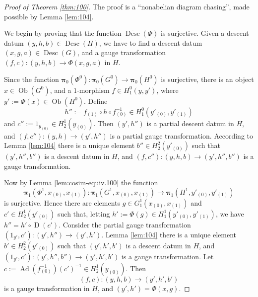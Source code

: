 \documentclass[a4paper,10pt]{amsart}
\theoremstyle{definition}
\numberwithin{equation}{section}
\newcommand{\opn}{\operatorname}
\newcommand{\ol}{\overline}
\newcommand{\tup}[1]{\textup{#1}}
\newcommand{\bsym}[1]{\boldsymbol{#1}}
\begin{document}
\begin{proof}[Proof of Theorem \tup{\ref{thm:100}}]
The proof is a ``nonabelian diagram chasing'', made possible by
Lemma \ref{lem:104}.

We begin by proving that the function $\ol{\opn{Desc}}(\Phi)$ is
surjective. Given a descent datum $(y, h, b) \in \opn{Desc}(H)$, we
have to find a descent datum $(x, g, a) \in \opn{Desc}(G)$, and a gauge
transformation $(f, c) :  (y, h, b) \to \Phi(x, g, a)$ in $H$. 

Since the function 
$\bsym{\bsym{\pi}}_0(\Phi^0) : \bsym{\bsym{\pi}}_0(G^0) \to
\bsym{\bsym{\pi}}_0(H^0)$
is surjective, there is an object $x \in \opn{Ob}(G^0)$, and a
$1$-morphism $f \in H^0_1(y, y')$, where 
$y' := \Phi(x) \in \opn{Ob}(H^0)$. 
Define 
\[ h'' := f_{(1)} \circ h \circ f_{(0)}^{-1} \in 
H^0_1(y'_{(0)}, y'_{(1)})  \]
and 
$c'' := 1_{y_{(0)}} \in H^1_2(y_{(0)})$. 
Then $(y', h'')$ is a partial descent datum in $H$, and 
$(f, c''): (y, h) \to (y', h'')$ is a partial gauge transformation.
According to Lemma \ref{lem:104} there is a unique element 
$b'' \in H^2_2(y'_{(0)})$ such that 
$(y', h'', b'')$ is a descent datum in $H$, and 
$(f, c''): (y, h, b) \to (y', h'', b'')$ is a gauge transformation.

Now by Lemma \ref{lem:cosim-equiv.100} the function 
\[ \bsym{\bsym{\pi}}_1(\Phi^1, x_{(0)}, x_{(1)}) : 
\bsym{\bsym{\pi}}_1(G^1, x_{(0)}, x_{(1)}) \to
\bsym{\bsym{\pi}}_1 ( H^1, y'_{(0)}, y'_{(1)}) \]
is surjective. Hence there are elements
$g \in G^1_1(x_{(0)}, x_{(1)})$ and 
$c' \in H^1_2(y'_{(0)})$
such that, letting 
$h' := \Phi(g) \in H^1_1(y'_{(0)}, y'_{(1)})$, 
we have 
$h'' = h' \circ \opn{D}(c')$.
Consider the partial gauge transformation 
$(1_{y'}, c') : (y', h'') \to (y', h')$.
Lemma \ref{lem:104} there is a unique element 
$b' \in H^2_2(y'_{(0)})$ such that 
$(y', h', b')$ is a descent datum in $H$, and 
$(1_{y'}, c') : (y', h'', b'') \to (y', h', b')$
is a gauge transformation. Let 
$c := \opn{Ad}(f_{(0)}^{-1})(c')^{-1} \in H^1_2(y_{(0)})$.
Then 
\[ (f, c) :  (y, h, b) \to (y', h', b') \]
is a gauge transformation in $H$, and $(y', h') = \Phi(x, g)$. 


\end{proof}
\end{document}
